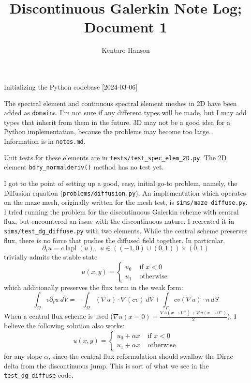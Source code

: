\documentclass[12pt, letterpaper]{article}
\title{Discontinuous Galerkin Note Log; Document 1}
\author{Kentaro Hanson}
\date{}
\begin{document}
\begin{titlepage}
\maketitle
\end{titlepage}
\begin{section}{Initializing the Python codebase}
[2024-03-06]

The spectral element and continuous spectral element meshes in 2D have been added as \verb+domain+s. I'm not sure if any different types will be made, but I may add types that inherit from them in the future. 3D may not be a good idea for a Python implementation, because the problems may become too large. Information is in \verb+notes.md+.

\bigskip

Unit tests for these elements are in \verb+tests/test_spec_elem_2D.py+. The 2D element \verb+bdry_normalderiv()+ method has no test yet.

\bigskip

I got to the point of setting up a good, easy, initial go-to problem, namely, the Diffusion equation (\verb+problems/diffusion.py+). An implementation which operates on the maze mesh, originally written for the mesh test, is \verb+sims/maze_diffuse.py+. I tried running the problem for the discontinuous Galerkin scheme with central flux, but encountered an issue with the discontinuous nature. I recreated it in \verb+sims/test_dg_diffuse.py+ with two elements. While the central scheme preserves flux, there is no force that pushes the diffused field together. In particular,
$$\partial_t u = c\operatorname{lapl}(u),~~u\in((-1,0)\cup(0,1))\times (0,1)$$
trivially admits the stable state
$$u(x,y) = \left\{\begin{array}{ll}
u_0 & \text{ if } x < 0\\
u_1 & \text{ otherwise}
\end{array}\right.$$
which additionally preserves the flux term in the weak form:
$$\int_{\Omega} v\partial_t u~dV=-\int_{\Omega}(\nabla u)\cdot\nabla( cv)~dV+\int_{\Gamma}cv(\nabla u)\cdot n\,dS$$
When a central flux scheme is used ($\nabla u (x=0) = \frac{\nabla u(x\to 0^+) + \nabla u(x\to 0^-)}2$), I believe the following solution also works:
$$u(x,y) = \left\{\begin{array}{ll}
u_0 + \alpha x & \text{ if } x < 0\\
u_1 + \alpha x & \text{ otherwise}
\end{array}\right.$$
for any slope $\alpha$, since the central flux reformulation should swallow the Dirac delta from the discontinuous jump. This is sort of what we see in the \verb+test_dg_diffuse+ code.


\end{section}
\end{document}
